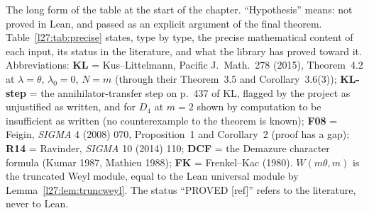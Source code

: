 The long form of the table at the start of the chapter. ``Hypothesis'' means: not proved in Lean, and passed as an explicit argument
of the final theorem. Table~\ref{l27:tab:precise} states, type by type, the precise mathematical content of each input, its status in
the literature, and what the library has proved toward it. Abbreviations: \textbf{KL} = Kus--Littelmann, Pacific J.\ Math.\ 278 (2015),
Theorem~4.2 at $\lambda=\theta$, $\lambda_0=0$, $N=m$ (through their Theorem~3.5 and Corollary~3.6(3)); \textbf{KL-step} = the
annihilator-transfer step on p.~437 of KL, flagged by the project as unjustified as written, and for $D_4$ at $m=2$ shown by
computation to be insufficient as written (no counterexample to the theorem is known);
\textbf{F08} = Feigin, \emph{SIGMA} 4 (2008) 070, Proposition~1 and Corollary~2 (proof has a gap); \textbf{R14} = Ravinder,
\emph{SIGMA} 10 (2014) 110; \textbf{DCF} = the Demazure character formula (Kumar 1987, Mathieu 1988); \textbf{FK} = Frenkel--Kac
(1980). $W(m\theta,m)$ is the truncated Weyl module, equal to the Lean universal module by Lemma~\ref{l27:lem:truncweyl}.
The status ``PROVED [ref]'' refers to the literature, never to Lean.

